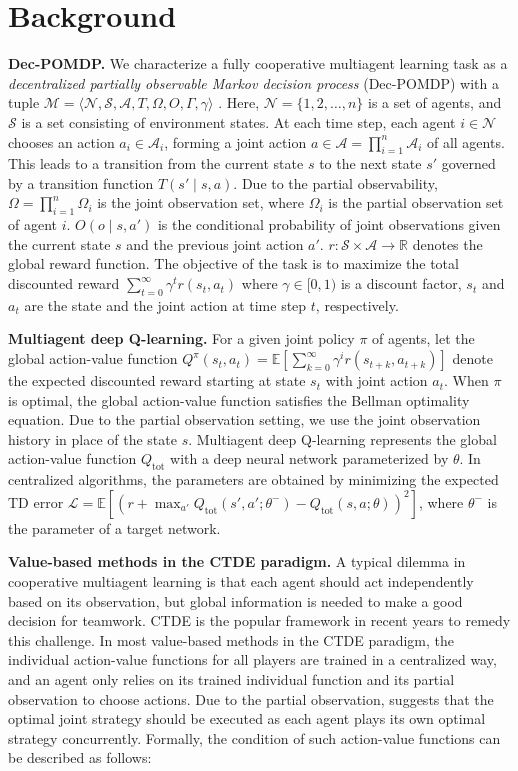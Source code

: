 
\section{Background}
    \textbf{Dec-POMDP.} We characterize a fully cooperative multiagent learning task as a \emph{decentralized partially observable Markov decision process} (Dec-POMDP) with a tuple $\mathcal{M} = \langle\mathcal{N}, \mathcal{S}, \mathcal{A}, T, \Omega, O, \Gamma, \gamma \rangle$ \cite{r1}. Here, $\mathcal{N} = \{1,2,\ldots, n\}$ is a set of agents, and $\mathcal{S}$ is a set consisting of environment states. At each time step, each agent $i \in \mathcal{N}$ chooses an action $a_i \in \mathcal{A}_i$, forming a joint action $a \in \mathcal{A} = \prod_{i=1}^n \mathcal{A}_i$ of all agents. This leads to a transition from the current state $s$ to the next state $s'$ governed by a transition function $T(s' \mid s, a)$. Due to the partial observability, $\Omega = \prod_{i=1}^n \Omega_i$ is the joint observation set, where $\Omega_i$ is the partial observation set of agent $i$. $O(o \mid s, a')$ is the conditional probability of joint observations given the current state $s$ and the previous joint action $a'$. $r: \mathcal{S} \times \mathcal{A} \rightarrow \mathbb{R}$ denotes the global reward function. The objective of the task is to maximize the total discounted reward $\sum_{t=0}^\infty \gamma^t r(s_t, a_t)$ where $\gamma \in [0, 1)$ is a discount factor, $s_t$ and $a_t$ are the state and the joint action at time step $t$, respectively.

    \textbf{Multiagent deep Q-learning.} For a given joint policy $\pi$ of agents, let the global action-value function $Q^\pi(s_t,a_t)=\mathbb{E}[\sum_{k=0}^\infty \gamma^i r(s_{t+k},a_{t+k})]$ denote the expected discounted reward starting at state $s_t$ with joint action $a_t$. When $\pi$ is optimal, the global action-value function satisfies the Bellman optimality equation. Due to the partial observation setting, we use the joint observation history in place of the state $s$. Multiagent deep Q-learning represents the global action-value function $Q_{\text{tot}}$ with a deep neural network parameterized by $\theta$. In centralized algorithms, the parameters are obtained by minimizing the expected TD error $\mathcal{L}= \mathbb{E} \left[ \left( r + \max_{a'} Q_{\text{tot}}(s', a'; \theta^-) - Q_{\text{tot}}(s, a; \theta) \right)^2 \right]$, where $\theta^-$ is the parameter of a target network.
    
    \textbf{Value-based methods in the CTDE paradigm.} A typical dilemma in cooperative multiagent learning is that each agent should act independently based on its observation, but global information is needed to make a good decision for teamwork. CTDE \cite{r2} is the popular framework in recent years to remedy this challenge. In most value-based methods in the CTDE paradigm, the individual action-value functions for all players are trained in a centralized way, and an agent only relies on its trained individual function and its partial observation to choose actions. Due to the partial observation, \cite{r3} suggests that the optimal joint strategy should be executed as each agent plays its own optimal strategy concurrently. Formally, the condition of such action-value functions can be described as follows:

